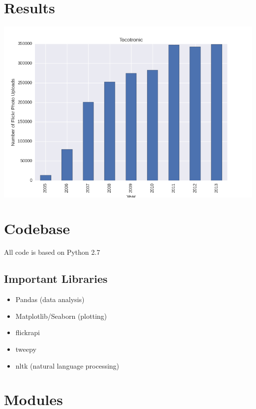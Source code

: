 \documentclass[letterpaper,10pt,english]{sphinxmanual}
\begin{document}
\chapter{Results}
\label{results::doc}\label{results:results}
\includegraphics{flickr-switzerland.png}


\chapter{Codebase}
\label{codebase:codebase}\label{codebase::doc}
All code is based on Python 2.7


\section{Important Libraries}
\label{codebase:important-libraries}\begin{itemize}
\item {} 
Pandas (data analysis)

\item {} 
Matplotlib/Seaborn (plotting)

\item {} 
flickrapi

\item {} 
tweepy

\item {} 
nltk (natural language processing)

\end{itemize}


\chapter{Modules}
\label{modules:modules}\label{modules::doc}
\end{document}
